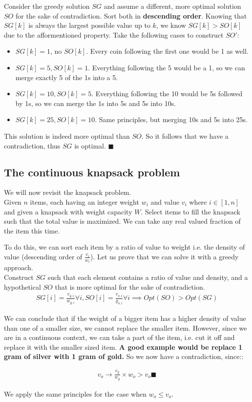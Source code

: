 \documentclass[12pt]{book}
\begin{document}
Consider the greedy solution $SG$ and assume a different, more optimal solution $SO$ for the sake of contradiction. Sort both in \textbf{descending order}. Knowing that $SG[k]$ is always the largest possible value up to $k$, we know $SG[k]>SO[k]$ due to the afformentioned property. Take the following cases to construct $SO'$:

\begin{itemize}
    \item $SG[k]=1$, no $SO[k]$. Every coin following the first one would be 1 as well.
    \item $SG[k]=5,SO[k]=1$. Everything following the 5 would be a 1, so we can merge exactly 5 of the 1s into a 5.
    \item $SG[k]=10,SO[k]=5$. Everything following the 10 would be 5s followed by 1s, so we can merge the 1s into 5s and 5s into 10s.
    \item $SG[k]=25,SO[k]=10$. Same principles, but merging 10s and 5s into 25s.
\end{itemize}

This solution is indeed more optimal than $SO$. So it follows that we have a contradiction, thus $SG$ is optimal. $\blacksquare$

\subsection*{The continuous knapsack problem}

We will now revisit the knapsack problem.\\

Given $n$ items, each having an integer weight $w_i$ and value $v_i$ where $i\in [1,n]$ and given a knapsack with weight capacity $W$. Select items to fill the knapsack such that the total value is maximized. We can take any real valued fraction of the item this time.

To do this, we can sort each item by a ratio of value to weight i.e. the density of value (descending order of $\frac{v_i}{w_i}$). Let us prove that we can solve it with a greedy approach.\\

Construct $SG$ such that each element contains a ratio of value and density, and a hypothetical $SO$ that is more optimal for the sake of contradiction.
\begin{align*}
    SG[i]=\frac{v_{g,i}}{w_{g,i}}\forall i, SO[i]=\frac{v_{o,i}}{g_{o,i}}\forall i\implies Opt(SO)>Opt(SG)
\end{align*}

We can conclude that if the weight of a bigger item has a higher density of value than one of a smaller size, we cannot replace the smaller item. However, since we are in a continuous context, we can take a part of the item, i.e. cut it off and replace it with the smaller sized item. \textbf{A good example would be replace 1 gram of silver with 1 gram of gold.} So we now have a contradiction, since::

\begin{align*}
    v_o\rightarrow \frac{v_g}{w_g}\times w_o>v_o\blacksquare
\end{align*}

We apply the same principles for the case when $w_o \leq v_o$.
\end{document}
